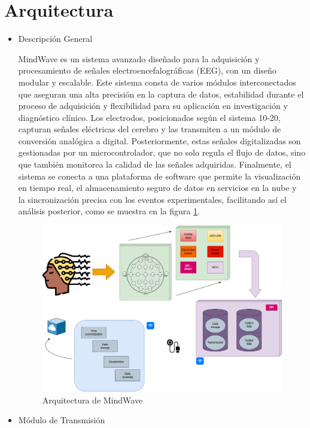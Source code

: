 \section{Arquitectura}

\begin{itemize}

    \item{Descripción General}

MindWave es un sistema avanzado diseñado para la adquisición y procesamiento de señales electroencefalográficas (EEG), con un diseño modular y escalable. Este sistema consta de varios módulos interconectados que aseguran una alta precisión en la captura de datos, estabilidad durante el proceso de adquisición y flexibilidad para su aplicación en investigación y diagnóstico clínico. Los electrodos, posicionados según el sistema 10-20, capturan señales eléctricas del cerebro y las transmiten a un módulo de conversión analógica a digital. Posteriormente, estas señales digitalizadas son gestionadas por un microcontrolador, que no solo regula el flujo de datos, sino que también monitorea la calidad de las señales adquiridas. Finalmente, el sistema se conecta a una plataforma de software que permite la visualización en tiempo real, el almacenamiento seguro de datos en servicios en la nube y la sincronización precisa con los eventos experimentales, facilitando así el análisis posterior, como se muestra en la figura \ref{fig:Esquema}.

\begin{figure}
    \centering
    \includegraphics[width=0.8\linewidth]{Figures/DBP.png}
    \caption{Arquitectura de MindWave}
    \label{fig:Esquema}
\end{figure}

    \item {Módulo de Transmisión}


\end{itemize}

